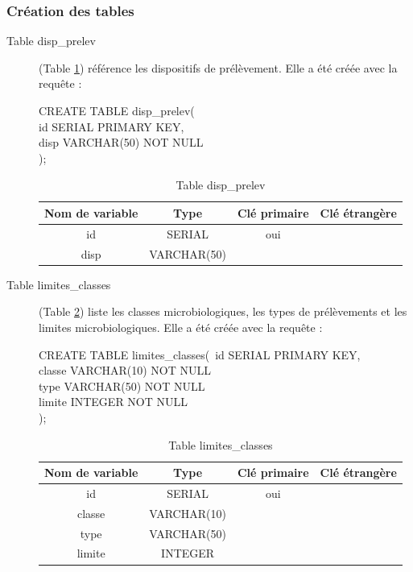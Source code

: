\documentclass[12pt,a4paper,oneside]{article}
\begin{document}
\subsubsection{Création des tables}
\begin{description}
\item[Table disp\_prelev] (Table \ref{disp}) référence les dispositifs de prélèvement. Elle a été créée avec la requête :
\begin{tabbing}
CREATE TABLE disp\_prelev(\\
id SERIAL PRIMARY KEY,\\
disp VARCHAR(50) NOT NULL\\
);
\end{tabbing}
\begin{table}
\caption{Table disp\_prelev \label{disp}}
\begin{center}
\begin{tabular}{|c|c|c|c|}
	\hline
	\textbf{Nom de variable} & \textbf{Type} & \textbf{Clé primaire} & \textbf{Clé étrangère}\\
	\hline
	id & SERIAL & oui &\\
	disp & VARCHAR(50)& &\\
	\hline
\end{tabular}
\end{center}
\end{table}

\item[Table limites\_classes] (Table \ref{classes}) liste les classes microbiologiques, les types de prélèvements et les limites microbiologiques. Elle a été créée avec la requête :
\begin{tabbing}
CREATE TABLE limites\_classes(\
id SERIAL PRIMARY KEY,\\
classe VARCHAR(10) NOT NULL\\
type VARCHAR(50) NOT NULL\\
limite INTEGER NOT NULL\\
);
\end{tabbing}
\begin{table}
\caption{Table limites\_classes \label{classes}}
\begin{center}
\begin{tabular}{|c|c|c|c|}
	\hline
	\textbf{Nom de variable} & \textbf{Type} & \textbf{Clé primaire} & \textbf{Clé étrangère}\\
	\hline
	id & SERIAL & oui &\\
	classe & VARCHAR(10)& &\\
	type & VARCHAR(50)& &\\
	limite & INTEGER & &\\
	\hline
\end{tabular}
\end{center}
\end{table}


\end{description}
\end{document}
